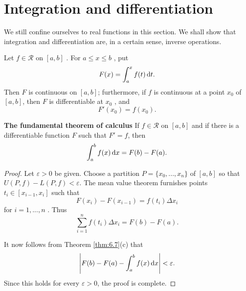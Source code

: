 \section{Integration and differentiation}

We still confine ourselves to real functions in this section. 
We shall show that integration and differentiation are, in a certain sense, inverse operations.

\begin{thm}
    \label{thm:6.20}
    Let $f \in \mathscr{R}$ on $[a,b]$ .
    For $a \leq x \leq b$ , put
    \begin{equation*}
        F(x) = \int_{a}^{x} f(t) \d t.
    \end{equation*}
    Then $F$ is continuous on $[a, b ]$;
    furthermore, if $f$ is continuous at a point $x_0$ of $[a, b ]$, 
    then $F$ is differentiable at $x_0$ , and
    \begin{equation*}
        F'(x_0) = f(x_0).
    \end{equation*}
\end{thm}

\begin{thm}
    \label{thm:6.21}
    \textbf{The fundamental theorem of calculus}
    If $f \in \mathscr{R}$ on $[a,b]$ 
    and if there is a differentiable function $F$
    such that $F' = f$, then
    \begin{equation*}
        \int_{a}^{b} f(x) \d x = F(b) - F(a).
    \end{equation*}
\end{thm}
\begin{proof}
    Let $\varepsilon > 0$ be given.
    Choose a partition $P = \{x_0,...,x_n\}$ of $[a,b]$ 
    so that $U(P,f) - L(P,f)<\varepsilon$.
    The mean value theorem furnishes points $t_i \in [x_{i-1}, x_i]$
    such that
    \begin{equation*}
        F(x_i) - F(x_{i-1}) = f(t_i) \Delta x_i
    \end{equation*}
    for $i = 1,...,n$ . Thus 
    \begin{equation*}
        \sum_{i=1}^{n} f(t_i) \Delta x_i = F(b) - F(a).
    \end{equation*}

    It now follows from Theorem \ref{thm:6.7}(c) that
    \begin{equation*}
        \left| F(b) - F(a) - \int_{a}^{b} f(x) \d x \right|  < \varepsilon.
    \end{equation*}
    Since this holds for every $\varepsilon > 0$,
    the proof is complete.
\end{proof}

